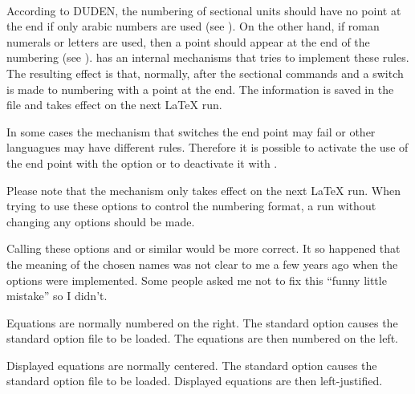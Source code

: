 \begin{Declaration}
  \\
\end{Declaration}%
%
%
\begin{Explain}%
  According to {\small DUDEN}, the numbering of sectional units should
  have no point at the end if only arabic numbers are used (see
  \cite[R\,3]{DUDEN}). On the other hand, if roman numerals or letters
  are used, then a point should appear at the end of the numbering (see
  \cite[R\,4]{DUDEN}). {\KOMAScript} has an internal mechanisms that
  tries to implement these rules. The resulting effect is that,
  normally, after the sectional commands  and
   a switch is made to numbering with a point at the
  end. The information is saved in the  file and takes
  effect on the next \LaTeX{} run.
\end{Explain}

In some cases the mechanism that switches the end point may fail or
other languagues may have different rules. Therefore it is possible to
activate the use of the end point with the option
 or to deactivate it with
.

Please note that the mechanism only takes effect on the next \LaTeX{}
run.  When trying to use these options to control the numbering
format, a run without changing any options should be made.

Calling these options  and
 or similar would be more
correct. It so happened that the meaning of the chosen names was not clear to
me a few years ago when the options were implemented. Some people asked me not
to fix this ``funny little mistake'' so I didn't.
%
%
%

\begin{Declaration}
\end{Declaration}%
%
Equations are normally numbered on the right.  The
standard option  causes the standard option file
 to be loaded. The equations are then numbered on the
left.
%
%


\begin{Declaration}
\end{Declaration}%
%
Displayed equations are normally centered. The standard option
 causes the standard option file  to be
loaded. Displayed equations are then left-justified.
%
%

